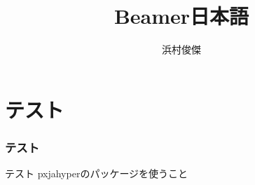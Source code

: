 \documentclass[dvipdfmx]{beamer}
\title{Beamer日本語}
\author{浜村俊傑}
\begin{document}
	\maketitle
	\section{テスト}
	\begin{frame}
		\frametitle{テスト}
		\begin{block}{テスト}
		pxjahyperのパッケージを使うこと
		\end{block}
	\end{frame}
\end{document}
